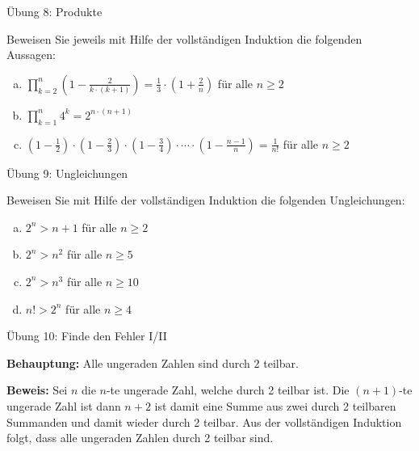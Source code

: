 \documentclass[12pt,ngerman,a4paper,ignorenonframetext,]{beamer}
\providecommand{\tightlist}{%
  \setlength{\itemsep}{0pt}\setlength{\parskip}{0pt}}
\begin{document}
\begin{frame}{Übung 8: Produkte}
\protect\hypertarget{ubung-8-produkte}{}

Beweisen Sie jeweils mit Hilfe der vollständigen Induktion die folgenden
Aussagen:

\begin{enumerate}
[a)]
\tightlist
\item
  \(\displaystyle \prod^n_{k=2} \left(1-\frac{2}{k\cdot (k+1)}\right) = \frac{1}{3} \cdot \left(1+\frac{2}{n}\right)\)
  für alle \(n \geq 2\)
\item
  \(\displaystyle \prod^n_{k=1} 4^k = 2^{n \cdot (n+1)}\)
\item
  \(\displaystyle \left(1-\frac{1}{2}\right) \cdot \left(1-\frac{2}{3}\right) \cdot \left(1-\frac{3}{4}\right) \cdot \cdots \cdot \left(1-\frac{n-1}{n}\right) = \frac{1}{n!}\)
  für alle \(n\geq 2\)
\end{enumerate}

\note{}

\end{frame}

\begin{frame}{Übung 9: Ungleichungen}
\protect\hypertarget{ubung-9-ungleichungen}{}

Beweisen Sie mit Hilfe der vollständigen Induktion die folgenden
Ungleichungen:

\begin{enumerate}
[a)]
\tightlist
\item
  \(\displaystyle 2^n > n+1\) für alle \(n \geq 2\)
\item
  \(\displaystyle 2^n > n^2\) für alle \(n \geq 5\)
\item
  \(\displaystyle 2^n > n^3\) für alle \(n \geq 10\)
\item
  \(\displaystyle n! > 2^n\) für alle \(n \geq 4\)
\end{enumerate}

\note{}

\end{frame}

\begin{frame}{Übung 10: Finde den Fehler I/II}
\protect\hypertarget{ubung-10-finde-den-fehler-iii}{}

\textbf{Behauptung:} Alle ungeraden Zahlen sind durch 2 teilbar.

\textbf{Beweis:} Sei \(n\) die \(n\)-te ungerade Zahl, welche durch 2
teilbar ist. Die \((n+1)\)-te ungerade Zahl ist dann \(n+2\) ist damit
eine Summe aus zwei durch 2 teilbaren Summanden und damit wieder durch 2
teilbar. Aus der vollständigen Induktion folgt, dass alle ungeraden
Zahlen durch 2 teilbar sind.

\end{frame}
\end{document}
